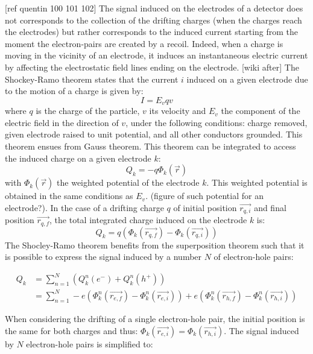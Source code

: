 [ref quentin 100 101 102]
The signal induced on the electrodes of a detector does not corresponds to the collection of the drifting charges (when the charges reach the electrodes) but rather corresponds to the induced current starting from the moment the electron-pairs are created by a recoil. Indeed, when a charge is moving in the vicinity of an electrode, it induces an instantaneous electric current by affecting the electrostatic field lines ending on the electrode. 
[wiki after]
The Shockey-Ramo theorem states that the current $i$ induced on a given electrode due to the motion of a charge is given by:
\begin{equation}
I = E_v q v
\end{equation}
where $q$ is the charge of the particle, $v$ its velocity and $E_v$ the component of the electric field in the direction of $v$, under the following conditions: charge removed, given electrode raised to unit potential, and all other conductors grounded. This theorem ensues from Gauss theorem.
This theorem can be integrated to access the induced charge on a given electrode $k$:
\begin{equation}
\label{eq:ramo-theorem-integrated}
Q_k = - q \Phi_k(\vec{r})
\end{equation}
with $\Phi_k(\vec{r})$ the weighted potential of the electrode $k$. This weighted potential is obtained in the same conditions as $E_v$. (figure of such potential for an electrode?).
In the case of a drifting charge $q$ of initial position $\vec{r_{q,i}}$ and final position $\vec{r_{q,f}}$, the total integrated charge induced on the electrode $k$ is:
\begin{equation}
Q_k = q \left( \Phi_k (\vec{r_{q,f}}) - \Phi_k (\vec{r_{q,i}}) \right)
\end{equation}
The Shocley-Ramo theorem benefits from the superposition theorem such that it is possible to express the signal induced by a number $N$ of electron-hole pairs:

\begin{align}
Q_k &= \sum_{n=1}^{N} \left( Q_k^n(e^-) + Q_k^n(h^+) \right) \\
&= \sum_{n=1}^{N} -e \left( \Phi_k^n (\vec{r_{e,f}}) - \Phi_k^n (\vec{r_{e,i}}) \right) +e \left( \Phi_k^n (\vec{r_{h,f}}) - \Phi_k^n (\vec{r_{h,i}}) \right)
\end{align}

When considering the drifting of a single electron-hole pair, the initial position is the same for both charges and thus: $\Phi_k (\vec{r_{e,i}}) = \Phi_k (\vec{r_{h,i}})$.
The signal induced by $N$ electron-hole pairs is simplified to:

